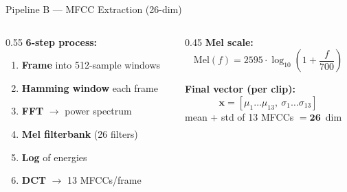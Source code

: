\documentclass[aspectratio=169]{beamer}
\begin{document}
\begin{frame}{Pipeline B — MFCC Extraction (26-dim)}
\begin{columns}
\begin{column}{0.55\textwidth}
\textbf{6-step process:}
\begin{enumerate}
    \item \textbf{Frame} into 512-sample windows
    \item \textbf{Hamming window} each frame
    \item \textbf{FFT} $\rightarrow$ power spectrum
    \item \textbf{Mel filterbank} (26 filters)
    \item \textbf{Log} of energies
    \item \textbf{DCT} $\rightarrow$ 13 MFCCs/frame
\end{enumerate}
\end{column}
\begin{column}{0.45\textwidth}
\textbf{Mel scale:}
$$\text{Mel}(f) = 2595 \cdot \log_{10}\!\left(1 + \frac{f}{700}\right)$$

\vspace{0.3cm}
\textbf{Final vector (per clip):}
$$\mathbf{x} = [\mu_1 \ldots \mu_{13},\ \sigma_1 \ldots \sigma_{13}]$$
mean + std of 13 MFCCs $= \mathbf{26}$~dim
\end{column}
\end{columns}
\end{frame}

\end{document}
